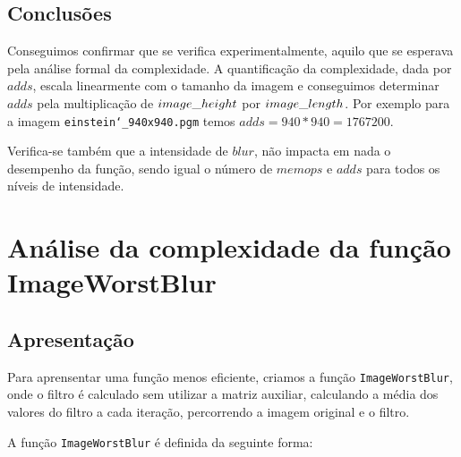 \documentclass{report}
\begin{document}
\newpage

\subsection{Conclusões}

Conseguimos confirmar que se verifica experimentalmente, aquilo que se esperava pela análise formal da complexidade. 
A quantificação da complexidade, dada por \(adds\), escala linearmente com o tamanho da imagem e 
conseguimos determinar \(adds\) pela multiplicação de \(image\char`_height\) por \(image\char`_length\). 
Por exemplo para a imagem \texttt{einstein\char`_940x940.pgm} temos \texttt{$adds = 940*940 = 1767200$}.
\par
Verifica-se também que a intensidade de \(blur\), não impacta em nada o desempenho da função, sendo igual o número de \(memops\) e \(adds\) 
para todos os níveis de intensidade.


\section{Análise da complexidade da função ImageWorstBlur}

\subsection{Apresentação}
Para aprensentar uma função menos eficiente, criamos a função \texttt{ImageWorstBlur}, onde o filtro é calculado sem utilizar a matriz auxiliar,
calculando a média dos valores do filtro a cada iteração, percorrendo a imagem original e o filtro.
\par
A função \texttt{ImageWorstBlur} é definida da seguinte forma:
\end{document}
